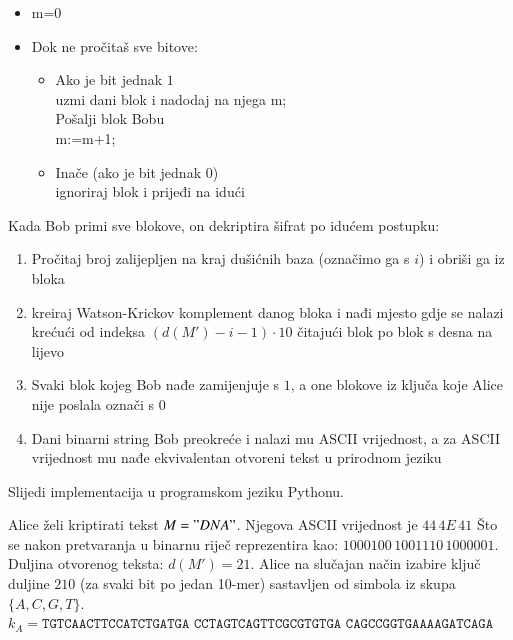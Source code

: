 \documentclass[a4paper,oneside,12pt]{memoir} %
\begin{document}
\begin{spacing}{1.5}
\begin{enumerate}
	\begin{itemize}
		\item m=0
		\item Dok ne pročitaš sve bitove:
		\begin{itemize}		
			\item Ako je bit jednak $1$\\
		  uzmi dani blok i nadodaj na njega m; \\
			Pošalji blok Bobu\\		  
		   m:=m+1;
			\item Inače (ako je bit jednak $0$)\\
		ignoriraj blok i prijeđi na idući
		\end{itemize}	
	\end{itemize}
\end{enumerate}
Kada Bob primi sve blokove, on dekriptira šifrat po idućem postupku:
\begin{enumerate}
	\item Pročitaj broj zalijepljen na kraj dušićnih baza (označimo ga s $i$) i obriši ga iz bloka
	\item kreiraj Watson-Krickov komplement danog bloka i nađi mjesto gdje se nalazi krećući od indeksa $(d(M')-i-1)\cdot 10$ čitajući blok po blok s desna na lijevo
	\item Svaki blok kojeg Bob nađe zamijenjuje s $1$, a one blokove iz ključa koje Alice nije poslala označi s $0$
	\item Dani binarni string Bob preokreće i nalazi mu ASCII vrijednost, a za ASCII vrijednost mu nađe ekvivalentan otvoreni tekst u prirodnom jeziku 
\end{enumerate}
Slijedi implementacija u programskom jeziku Pythonu.

\begin{exa}
Alice želi kriptirati tekst $M="DNA"$. Njegova ASCII vrijednost je $44\, 4E\,41$ Što se nakon pretvaranja u binarnu riječ reprezentira kao: $1000100\,1001110\,1000001$. Duljina otvorenog teksta: $d(M')=21$. Alice na slučajan način izabire ključ duljine $210$ (za svaki bit po jedan 10-mer) sastavljen od simbola iz skupa $\{A,C,G,T\}$.\\
$k_A=
 \mathtt{TGTCAACTTC CATCTGATGA}$
$\mathtt{CCTAGTCAGT TCGCGTGTGA}$
$\mathtt{CAGCCGGTGA AAAGATCAGA}$\\

\end{exa}
\end{spacing}
\end{document}
